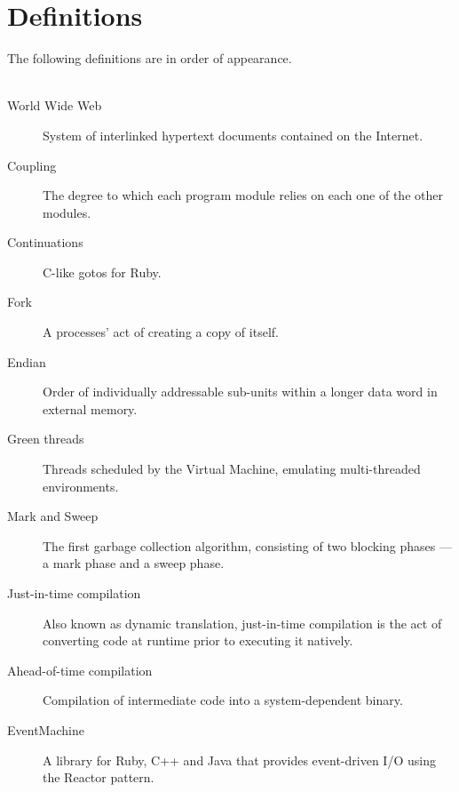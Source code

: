 \chapter*{Definitions} %
\label{cha:definitions}
The following definitions are in order of appearance.\\\\

\begin{description}
  \item[World Wide Web] System of interlinked hypertext documents contained on the Internet.
  \item[Coupling] The degree to which each program module relies on each one of the other modules.
  \item[Continuations] C-like gotos for Ruby.
  \item[Fork] A processes' act of creating a copy of itself.
  \item[Endian] Order of individually addressable sub-units within a longer data word in external memory.
  \item[Green threads] Threads scheduled by the Virtual Machine, emulating multi-threaded environments.
  \item[Mark and Sweep] The first garbage collection algorithm, consisting of two blocking phases --- a mark phase and a sweep phase.
  \item[Just-in-time compilation] Also known as dynamic translation, just-in-time compilation is the act of converting code at runtime prior to executing it natively.
  \item[Ahead-of-time compilation] Compilation of intermediate code into a system-dependent binary.
  \item[EventMachine] A library for Ruby, C++ and Java that provides event-driven I/O using the Reactor pattern.
\end{description}

